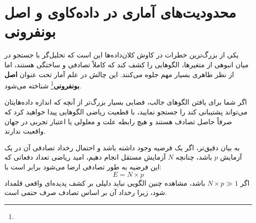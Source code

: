 \section{محدودیت‌های آماری در داده‌کاوی و اصل بونفرونی}
یکی از بزرگ‌ترین خطرات در کاوش کلان‌داده‌ها این است که تحلیل‌گر با جستجو در میان انبوهی از متغیرها، الگوهایی را کشف کند که کاملاً تصادفی و ساختگی هستند، اما از نظر ظاهری بسیار مهم جلوه می‌کنند. این چالش در علم آمار تحت عنوان \textbf{اصل بونفرونی}\footnote{} شناخته می‌شود.

\begin{theorem}
اگر شما برای یافتن الگوهای جالب، فضایی بسیار بزرگ‌تر از آنچه که اندازه داده‌هایتان می‌تواند پشتیبانی کند را جستجو نمایید، با قطعیت ریاضی الگوهایی پیدا خواهید کرد که صرفاً حاصل تصادف هستند و هیچ رابطه علت و معلولی یا اعتبار تجربی در جهان واقعیت ندارند.
\end{theorem}

به بیان دقیق‌تر، اگر یک فرضیه وجود داشته باشد و احتمال رخداد تصادفی آن در یک آزمایش $p$ باشد، چنانچه $N$ آزمایش مستقل انجام دهیم، امید ریاضی تعداد دفعاتی که این فرضیه به طور تصادفی ارضا می‌شود برابر است با:
\begin{equation}
E = N \times p
\end{equation}
اگر $N \times p \gg 1$ باشد، مشاهده چنین الگویی نباید دلیلی بر کشف پدیده‌ای واقعی قلمداد شود، زیرا رخداد آن بر اساس تصادف صرف حتمی است.

